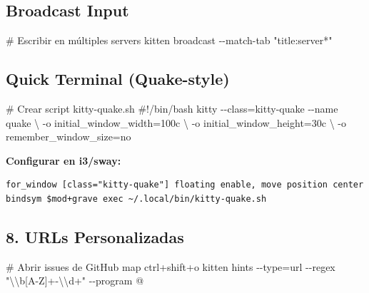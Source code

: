 \documentclass[
  doc,
  floatsintext,
  longtable,
  a4paper,
  nolmodern,
  notxfonts,
  notimes,
  12pt,
  colorlinks=true,linkcolor=blue,citecolor=blue,urlcolor=blue]{apa7}
\newenvironment{Shaded}{\begin{snugshade}}{\end{snugshade}}
\newcommand{\AttributeTok}[1]{\textcolor[rgb]{0.40,0.45,0.13}{#1}}
\newcommand{\CommentTok}[1]{\textcolor[rgb]{0.37,0.37,0.37}{#1}}
\newcommand{\DataTypeTok}[1]{\textcolor[rgb]{0.68,0.00,0.00}{#1}}
\newcommand{\DecValTok}[1]{\textcolor[rgb]{0.68,0.00,0.00}{#1}}
\newcommand{\ErrorTok}[1]{\textcolor[rgb]{0.68,0.00,0.00}{#1}}
\newcommand{\ExtensionTok}[1]{\textcolor[rgb]{0.00,0.23,0.31}{#1}}
\newcommand{\NormalTok}[1]{\textcolor[rgb]{0.00,0.23,0.31}{#1}}
\newcommand{\OperatorTok}[1]{\textcolor[rgb]{0.37,0.37,0.37}{#1}}
\newcommand{\SpecialCharTok}[1]{\textcolor[rgb]{0.37,0.37,0.37}{#1}}
\newcommand{\StringTok}[1]{\textcolor[rgb]{0.13,0.47,0.30}{#1}}
\begin{document}
\subsection{Broadcast Input}\label{broadcast-input}

\begin{Shaded}
\begin{Highlighting}[]
\CommentTok{\# Escribir en múltiples servers}
\ExtensionTok{kitten}\NormalTok{ broadcast }\AttributeTok{{-}{-}match{-}tab} \StringTok{"title:server*"}
\end{Highlighting}
\end{Shaded}

\subsection{Quick Terminal
(Quake-style)}\label{quick-terminal-quake-style}

\begin{Shaded}
\begin{Highlighting}[]
\CommentTok{\# Crear script kitty{-}quake.sh}
\CommentTok{\#!/bin/bash}
\DataTypeTok{kitty} \DataTypeTok{{-}{-}class}\OperatorTok{=}\DataTypeTok{kitty{-}quake} \DataTypeTok{{-}{-}name} \DataTypeTok{quake} \ErrorTok{\textbackslash{}}
  \DataTypeTok{{-}o} \DataTypeTok{initial\_window\_width}\OperatorTok{=}\DecValTok{100}\DataTypeTok{c} \ErrorTok{\textbackslash{}}
  \DataTypeTok{{-}o} \DataTypeTok{initial\_window\_height}\OperatorTok{=}\DecValTok{30}\DataTypeTok{c} \ErrorTok{\textbackslash{}}
  \DataTypeTok{{-}o} \DataTypeTok{remember\_window\_size}\OperatorTok{=}\DataTypeTok{no}
\end{Highlighting}
\end{Shaded}

\textbf{Configurar en i3/sway:}

\begin{verbatim}
for_window [class="kitty-quake"] floating enable, move position center
bindsym $mod+grave exec ~/.local/bin/kitty-quake.sh
\end{verbatim}

\subsection{8. URLs Personalizadas}\label{urls-personalizadas}

\begin{Shaded}
\begin{Highlighting}[]
\CommentTok{\# Abrir issues de GitHub}
\DataTypeTok{map} \DataTypeTok{ctrl}\ErrorTok{+}\DataTypeTok{shift}\ErrorTok{+}\DataTypeTok{o} \DataTypeTok{kitten} \DataTypeTok{hints} \DataTypeTok{{-}{-}type}\OperatorTok{=}\DataTypeTok{url} \DataTypeTok{{-}{-}regex} \DataTypeTok{"}\SpecialCharTok{\textbackslash{}\textbackslash{}}\DataTypeTok{b[A{-}Z]+{-}}\SpecialCharTok{\textbackslash{}\textbackslash{}}\DataTypeTok{d+"} \DataTypeTok{{-}{-}program} \ErrorTok{@}
\end{Highlighting}
\end{Shaded}
\end{document}
